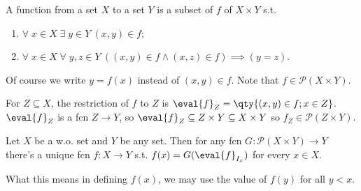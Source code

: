 \begin{note}
    A function from a set $X$ to a set $Y$ is a subset of $f$ of $X \times Y$ s.t.
    \begin{enumerate}
        \item $\forall \; x \in X \; \exists \; y \in Y \ (x, y) \in f$;
        \item $\forall \; x \in X \; \forall \; y, z \in Y \ ((x, y) \in f \wedge (x, z) \in f) \implies (y = z)$.
    \end{enumerate}

    Of course we write $y = f(x)$ instead of $(x, y) \in f$.
    Note that $f \in \mathcal{P}(X \times Y)$.

    For $Z \subseteq X$, the restriction of $f$ to $Z$ is $\eval{f}_Z = \qty{(x, y) \in f ; x \in Z}$.
    $\eval{f}_Z$ is a fcn $Z \to Y$, so $\eval{f}_Z \subseteq Z \times Y \subseteq X \times Y$ so $f_Z \in \mathcal{P}(Z \times Y)$.
\end{note}

\begin{theorem}
    Let $X$ be a w.o. set and $Y$ be any set.
    Then for any fcn $G \colon \mathcal{P}(X \times Y) \to Y$ there's a unique fcn $f : X \to Y$ s.t. $f(x) = G(\eval{f}_{I_x})$ for every $x \in X$.
\end{theorem}

\begin{remark}
    What this means in defining $f(x)$, we may use the value of $f(y)$ for all $y < x$.
\end{remark}

